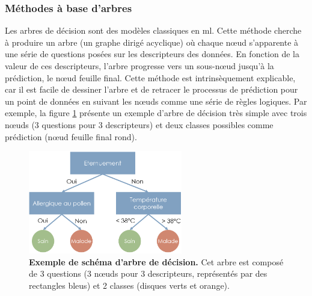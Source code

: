 \subsubsection{Méthodes à base d'arbres}
Les arbres de décision sont des modèles classiques en \gls{ml}. Cette méthode cherche à produire un arbre (un graphe dirigé acyclique) où chaque nœud s'apparente à une série de questions posées sur les descripteurs des données. En fonction de la valeur de ces descripteurs, l'arbre progresse vers un sous-nœud jusqu'à la prédiction, le nœud feuille final. Cette méthode est intrinsèquement explicable, car il est facile de dessiner l'arbre et de retracer le processus de prédiction pour un point de données en suivant les nœuds comme une série de règles logiques. Par exemple, la figure \ref{fig:decision-tree} présente un exemple d'arbre de décision très simple avec trois nœuds (3 questions pour 3 descripteurs) et deux classes possibles comme prédiction (nœud feuille final rond).
\begin{figure}[!htbp]
 \centering
 \includegraphics[width=0.6\textwidth]{figures/decision_tree.png}
 \caption[Exemple de schéma d'arbre de décision]{\textbf{Exemple de schéma d'arbre de décision.} Cet arbre est composé de 3 questions (3 nœuds pour 3 descripteurs, représentés par des rectangles bleus) et 2 classes (disques verts et orange).}
 \label{fig:decision-tree}
\end{figure}

